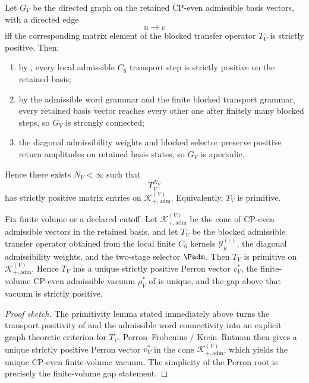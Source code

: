 \begin{tcolorbox}[colback=tfptblue!2, colframe=tfptblue!40, breakable,
    title={Primitivity lemma underlying Block 2}, colbacktitle=tfptblue!60]
Let $G_V$ be the directed graph on the retained CP-even admissible basis vectors, with a directed
edge
\[
u\to v
\]
iff the corresponding matrix element of the blocked transfer operator $T_V$ is strictly positive.
Then:
\begin{enumerate}[label=(\roman*), leftmargin=1.5em, topsep=3pt, itemsep=2pt]
    \item by , every local admissible $C_6$ transport step is
    strictly positive on the retained basis;
    \item by the admissible word grammar and the finite blocked transport grammar, every retained
    basis vector reaches every other one after finitely many blocked steps, so $G_V$ is strongly
    connected;
    \item the diagonal admissibility weights and blocked selector preserve positive return
    amplitudes on retained basis states, so $G_V$ is aperiodic.
\end{enumerate}
Hence there exists $N_V<\infty$ such that
\[
T_V^{N_V}
\]
has strictly positive matrix entries on $\mathcal K_{+,\mathrm{adm}}^{(V)}$. Equivalently, $T_V$
is primitive.
\end{tcolorbox}

\begin{theorem}
\label{thm:cp-even-vacuum-uniqueness}
Fix finite volume or a declared cutoff. Let $\mathcal K_{+,\mathrm{adm}}^{(V)}$ be the cone of
CP-even admissible vectors in the retained basis, and let $T_V$ be the blocked admissible
transfer operator obtained from the local finite $C_6$ kernels
$\mathcal Y_y^{(\varepsilon)}$, the diagonal admissibility weights, and the two-stage selector
$\Padm$. Then $T_V$ is primitive on $\mathcal K_{+,\mathrm{adm}}^{(V)}$. Hence $T_V$ has a unique
strictly positive Perron vector $v_V^\ast$, the finite-volume CP-even admissible vacuum
$\rho^\ast_V$ of  is unique, and the gap above that
vacuum is strictly positive.
\end{theorem}

\begin{proof}[Proof sketch]
The primitivity lemma stated immediately above turns the transport positivity of
 and the admissible word connectivity into an explicit
graph-theoretic criterion for $T_V$. Perron--Frobenius / Krein--Rutman then gives a unique
strictly positive Perron vector $v_V^\ast$ in the cone
$\mathcal K_{+,\mathrm{adm}}^{(V)}$, which yields the unique CP-even finite-volume vacuum. The
simplicity of the Perron root is precisely the finite-volume gap statement.
\end{proof}

